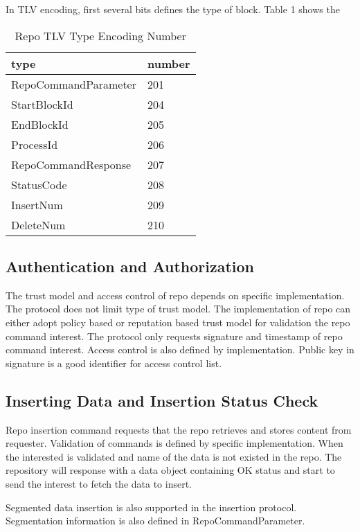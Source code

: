 \documentclass{acm_proc_article-sp}
\begin{document}
In TLV encoding, first several bits defines the type of block. Table 1 shows the 

\begin{table}[!hbp]
\centering

\begin{tabular}{l l}

\hline
type & number \\
\hline
RepoCommandParameter & 201 \\
StartBlockId & 204 \\
EndBlockId & 205 \\
ProcessId & 206 \\
RepoCommandResponse & 207\\
StatusCode & 208 \\
InsertNum & 209 \\
DeleteNum & 210 \\
\hline

\end{tabular}
\caption{Repo TLV Type Encoding Number}
\end{table}



\subsection{Authentication and Authorization}
The trust model and access control of repo depends on specific implementation. The protocol does not limit type of trust model. The implementation of repo can either adopt policy based or reputation based trust model for validation the repo command interest. The protocol only requests signature and timestamp of repo command interest. Access control is also defined by implementation. Public key in signature is a good identifier for access control list.

\subsection{Inserting Data and Insertion Status Check}

Repo insertion command requests that the repo retrieves and stores content from requester. Validation of commands is defined by specific implementation. When the interested is validated and name of the data is not existed in the repo. The repository will response with a data object containing OK status and start to send the interest to fetch the data to insert.

Segmented data insertion is also supported in the insertion protocol. Segmentation information is also defined in RepoCommandParameter.
\end{document}

